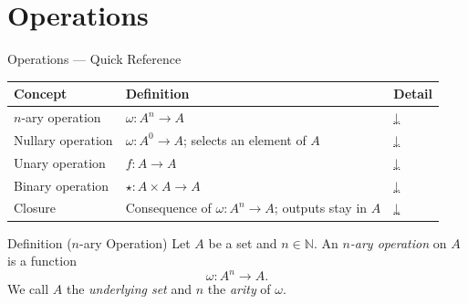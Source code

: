 
\section{Operations}

\begin{toolkitbox}{Operations — Quick Reference}
\small
\begin{tabular}{l l l}
\toprule
\textbf{Concept} & \textbf{Definition} & \textbf{Detail} \\
\midrule
$n$-ary operation  & $\omega : A^n \to A$                           & \hyperref[def:nary-op]{↓} \\
Nullary operation  & $\omega : A^0 \to A$; selects an element of $A$         & \hyperref[def:nullary-op]{↓} \\
Unary operation    & $f : A \to A$                                  & \hyperref[def:unary-op]{↓} \\
Binary operation   & $\star : A \times A \to A$                     & \hyperref[def:binary-op]{↓} \\
Closure            & Consequence of $\omega : A^n \to A$; outputs stay in $A$ & \hyperref[def:binary-op]{↓} \\
\bottomrule
\end{tabular}
\end{toolkitbox}



\begin{definitionbox}{Definition ($n$-ary Operation)}
\label{def:nary-op}
Let $A$ be a set and $n \in \mathbb{N}$.
An \emph{$n$-ary operation} on $A$ is a function
\[
  \omega : A^n \to A.
\]
We call $A$ the \emph{underlying set} and $n$ the \emph{arity} of $\omega$.
\end{definitionbox}

